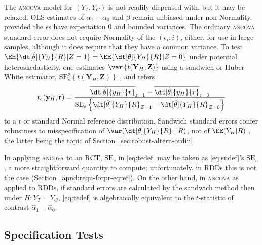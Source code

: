 The \textsc{ancova} model for $(Y_{T}, Y_{C})$ is not readily dispensed with, but it
may be relaxed.  OLS estimates of $\alpha_1-\alpha_{0}$ and
$\beta$ remain unbiased under non-Normality, provided
the $\epsilon$s have expectation 0 and bounded variances.  The
ordinary \textsc{ancova} standard error does not require Normality of
the $( \epsilon_{i}: i )$, either, for use in large samples, although
it does require that they have a common variance.  
To test
$\EE\{ \dt[\hat\theta]{{Y_H}}{ R} | Z=1\} = \EE\{ \dt[\hat\theta]{{Y_H}}{
R} | Z=0\}$
under potential heteroskedasticity, one estimates
$\var\left\{t(\mathbf{Y}_H , \mathbf{Z})\right\}$
using a sandwich or Huber-White estimator,
$\mathrm{SE}_{s}^{2} \left\{ t(\mathbf{Y}_H , \mathbf{Z}) \right\}$
\citep{huber1967behavior,mackinnonWhite1985sandwichHC,longErvin2000sandwichHC,
bellmccaffrey2002sandwichSEs,pustejovskyTipton2017sandwichSEs}, %
and refers
\begin{equation} \label{eq:tedef}
t_{e} (\mathbf{y}_H,\mathbf{r}) =
\frac{\overline{\dt[\hat\theta]{{y_H}}{ r}}_{z=1} -
                             \overline{\dt[\hat\theta]{{y_H}}{ r}}_{z=0}}%
                           {\mathrm{SE}_{s}\left\{ \overline{\dt[\hat\theta]{{Y_H}}{ R}}_{Z=1} -
                             \overline{\dt[\hat\theta]{{Y_H}}{ R}}_{Z=0}
                           \right\} }
\end{equation}
to a $t$ or standard Normal reference distribution.
Sandwich standard errors confer robustness to misspecification of
$\var(\dt[\hat\theta]{Y_{H}}{R}\mid  R)$, not of $\EE(Y_{H}| R)$ \citep{freedman2006sch}, the latter being the topic of
Section~\ref{sec:robust-altern-ordin}.

In applying \textsc{ancova} to an RCT, $\mathrm{SE}_{s}$ in
\eqref{eq:tedef} may be taken as \eqref{eq:sudef}'s
$\mathrm{SE}_{u}$%
, a more straightforward quantity to compute; unfortunately, in RDDs
this is not the case
(Section~\ref{apnd:requ-forpr-eqref}).  On the
other hand, in \textsc{ancova} as applied to RDDs, if standard
errors are calculated by the sandwich method then under
$H: Y_{T} = Y_{C}$, \eqref{eq:tedef} is algebraically equivalent to the
$t$-statistic of contrast $\hat{\alpha}_{1} -\hat{\alpha}_{0}$.

\subsection{Specification Tests}\label{sec:specification}



